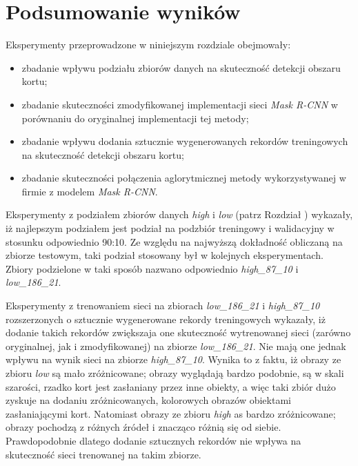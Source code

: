 \section{Podsumowanie wyników}

Eksperymenty przeprowadzone w niniejszym rozdziale obejmowały:
\begin{itemize}
 \item zbadanie wpływu podziału zbiorów danych na skuteczność detekcji obszaru kortu;
 \item zbadanie skuteczności zmodyfikowanej implementacji sieci \textit{Mask R-CNN} w porównaniu do oryginalnej implementacji tej metody;
 \item zbadanie wpływu dodania sztucznie wygenerowanych rekordów treningowych na skuteczność detekcji obszaru kortu;
 \item zbadanie skuteczności połączenia aglorytmicznej metody wykorzystywanej w firmie \blue{} z modelem \textit{Mask R-CNN}.
\end{itemize}

Eksperymenty z podziałem zbiorów danych \textit{high} i \textit{low} (patrz Rozdział ) wykazały, iż najlepszym podziałem jest podział na podzbiór treningowy i walidacyjny w stosunku odpowiednio 90:10. Ze względu na najwyższą dokładność obliczaną na zbiorze testowym, taki podział stosowany był w kolejnych eksperymentach. Zbiory podzielone w taki sposób nazwano odpowiednio \textit{high\_87\_10} i \textit{low\_186\_21}.




Eksperymenty z trenowaniem sieci na zbiorach \textit{low\_186\_21} i \textit{high\_87\_10} rozszerzonych o sztucznie wygenerowane rekordy treningowych wykazały, iż dodanie takich rekordów zwiększaja one skuteczność wytrenowanej sieci (zarówno oryginalnej, jak i zmodyfikowanej) na zbiorze \textit{low\_186\_21}. Nie mają one jednak wpływu na wynik sieci na zbiorze \textit{high\_87\_10}. Wynika to z faktu, iż obrazy ze zbioru \textit{low} są mało zróżnicowane; obrazy wyglądają bardzo podobnie, są w skali szarości, rzadko kort jest zasłaniany przez inne obiekty, a więc taki zbiór dużo zyskuje na dodaniu zróżnicowanych, kolorowych obrazów obiektami zasłaniającymi kort. Natomiast obrazy ze zbioru \textit{high} as bardzo zróżnicowane; obrazy pochodzą z różnych źródeł i znacząco różnią się od siebie. Prawdopodobnie dlatego dodanie sztucznych rekordów nie wpływa na skuteczność sieci trenowanej na takim zbiorze.


